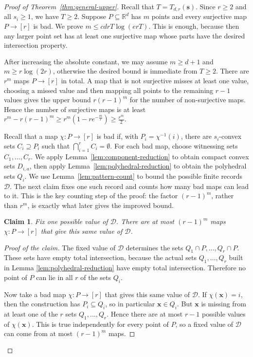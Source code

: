 \documentclass[11pt]{article}
\newtheorem{claim}[theorem]{Claim}
\theoremstyle{definition}
\newenvironment{poc}{\begin{proof}[Proof of the claim]\renewcommand*{\qedsymbol}{\(\blacksquare\)}}{\end{proof}}
\newcommand{\R}{\mathbb{R}}
\begin{document}
\begin{proof}[Proof of Theorem~\ref{thm:general-upper}]
Recall that \(T=T_{d,r}(\boldsymbol{s})\). Since \(r\ge 2\) and all \(s_{i}\ge 1\), we have \(T\ge 2\). Suppose \(P\subseteq\R^{d}\) has \(m\) points and every surjective map \(P\to [r]\) is bad. We prove \(m\le cdrT\log(erT)\). This is enough, because then any larger point set has at least one surjective map whose parts have the desired intersection property.

After increasing the absolute constant, we may assume \(m\ge d+1\) and \(m\ge r\log(2r)\), otherwise the desired bound is immediate from \(T\ge 2\). There are \(r^{m}\) maps \(P\to [r]\) in total. A map that is not surjective misses at least one value, choosing a missed value and then mapping all points to the remaining \(r-1\) values gives the upper bound \(r(r-1)^{m}\) for the number of non-surjective maps. Hence the number of surjective maps is at least \(r^{m}-r(r-1)^{m}\ge r^{m}(1-re^{-\frac{m}{r}})\ge \frac{r^{m}}{2}\).

Recall that a map \(\chi:P\to [r]\) is bad if, with \(P_{i}=\chi^{-1}(i)\), there are \(s_{i}\)-convex sets \(C_{i}\supseteq P_{i}\) such that \(\bigcap_{i=1}^{r}C_{i}=\emptyset\).
For each bad map, choose witnessing sets \(C_{1},\ldots,C_{r}\). We apply Lemma~\ref{lem:component-reduction} to obtain compact convex sets \(D_{i,a}\), then apply Lemma~\ref{lem:polyhedral-reduction} to obtain the polyhedral sets \(Q_{i}\). We use Lemma~\ref{lem:pattern-count} to bound the possible finite records \(\mathcal{D}\). The next claim fixes one such record and counts how many bad maps can lead to it. This is the key counting step of the proof: the factor \((r-1)^{m}\), rather than \(r^{m}\), is exactly what later gives the improved bound.
\begin{claim}\label{claim:one-tuple}
Fix one possible value of \(\mathcal{D}\). There are at most \((r-1)^{m}\) maps \(\chi:P\to [r]\) that give this same value of \(\mathcal{D}\).
\end{claim}
\begin{poc}
    The fixed value of \(\mathcal{D}\) determines the sets \(Q_{1}\cap P,\ldots,Q_{r}\cap P\). These sets have empty total intersection, because the actual sets \(Q_{1},\ldots,Q_{r}\) built in Lemma \ref{lem:polyhedral-reduction} have empty total intersection. Therefore no point of \(P\) can lie in all \(r\) of the sets \(Q_{i}\).

    Now take a bad map \(\chi:P\to [r]\) that gives this same value of \(\mathcal{D}\). If \(\chi(\boldsymbol{x})=i\), then the construction has \(P_{i}\subseteq Q_{i}\), so in particular \(\boldsymbol{x}\in Q_{i}\). But \(\boldsymbol{x}\) is missing from at least one of the \(r\) sets \(Q_{1},\ldots,Q_{r}\). Hence there are at most \(r-1\) possible values of \(\chi(\boldsymbol{x})\). This is true independently for every point of \(P\), so a fixed value of \(\mathcal{D}\) can come from at most \((r-1)^{m}\) maps.


\end{poc}
\end{proof}
\end{document}
